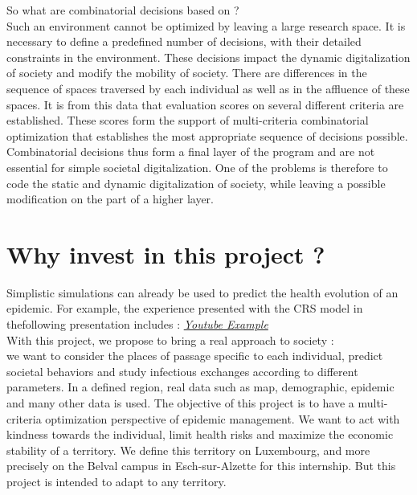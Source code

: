So what are combinatorial decisions based on ?\\

Such an environment cannot be optimized by leaving a large research space. It is necessary to define a predefined number of decisions, with their detailed constraints in the environment. These decisions impact the dynamic digitalization of society and modify the mobility of society. There are differences in the sequence of spaces traversed by each individual as well as in the affluence of these spaces. It is from this data that evaluation scores on several different criteria are established. These scores form the support of multi-criteria combinatorial optimization that establishes the most appropriate sequence of decisions possible.\\

Combinatorial decisions thus form a final layer of the program and are not essential for simple societal digitalization. One of the problems is therefore to code the static and dynamic digitalization of society, while leaving a possible modification on the part of a higher layer.\\

\newpage

\section*{Why invest in this project ?}

Simplistic simulations can already be used to predict the health evolution of an epidemic. For example, the experience presented with the CRS model in thefollowing presentation includes : \href{https://www.youtube.com/watch?v=gxAaO2rsdIs}{\textit{Youtube Example}}\\

With this project, we propose to bring a real approach to society : \\we want to consider the places of passage specific to each individual, predict societal behaviors and study infectious exchanges according to different parameters. In a defined region, real data such as map, demographic, epidemic and many other data is used. The objective of this project is to have a multi-criteria optimization perspective of epidemic management. We want to act with kindness towards the individual, limit health risks and maximize the economic stability of a territory. We define this territory on Luxembourg, and more precisely on the Belval campus in Esch-sur-Alzette for this internship. But this project is intended to adapt to any territory.\\

